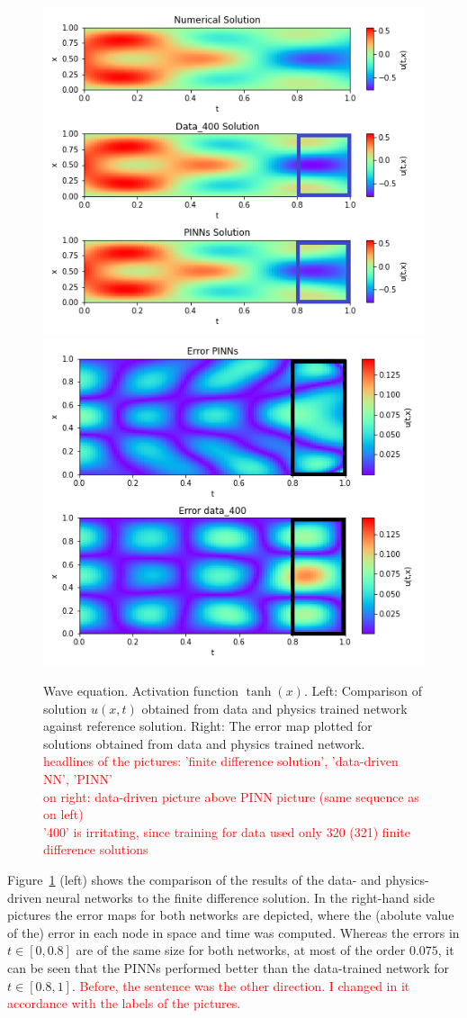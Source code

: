 \begin{figure}[t!]
\begin{center}
\includegraphics[width=0.4\linewidth]{../Code/B1/plots/colormap.png}
\includegraphics[width=0.4\linewidth]{../Code/B1/plots/error_colormap.png}
\end{center}
\caption{Wave equation. Activation function $\tanh(x)$. Left: Comparison of solution $u(x,t)$ obtained from data and physics trained network against reference solution. Right: The error map plotted for solutions obtained from data and physics trained network.\\
\textcolor{red}{headlines of the pictures: 'finite difference solution', 'data-driven NN', 'PINN'}\\
\textcolor{red}{on right: data-driven picture above PINN picture (same sequence as on left)}\\
\textcolor{red}{'400' is irritating, since training for data used only 320 (321) finite difference solutions}
}\label{fig:wave_sol_error}
\end{figure}

Figure~\ref{fig:wave_sol_error} (left) shows the comparison of the results of the 
data- and physics-driven neural networks to the finite difference solution. 
In the right-hand side pictures the error maps for both networks are depicted, where the 
(abolute value of the) error in each node in space and time was computed. 
Whereas the errors in $t\in[0,0.8]$ are of the same size for both networks, at most of the order $0.075$,
it can be seen that the PINNs performed better than the data-trained network for $t\in[0.8,1]$.
\textcolor{red}{Before, the sentence was the other direction. I changed in it accordance with the labels 
of the pictures.}

